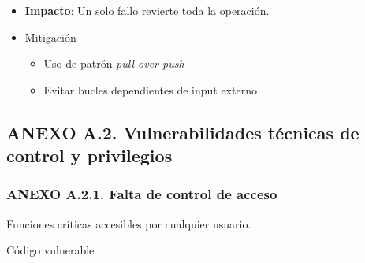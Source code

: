 \begin{itemize}
\tightlist
\item
  \textbf{Impacto}: Un solo fallo revierte toda la operación.
\item
  Mitigación

  \begin{itemize}
  \tightlist
  \item
    Uso de
    \href{https://medium.com/@markojauregui/the-pull-over-push-model-in-solidity-a-secure-pattern-for-fund-withdrawals-10c2e6628626}{patrón
    \emph{pull over push}}
  \item
    Evitar bucles dependientes de input externo
  \end{itemize}
\end{itemize}

\subsection{ANEXO A.2. Vulnerabilidades técnicas de control y
privilegios}\label{anexo-a.2.-vulnerabilidades-tuxe9cnicas-de-control-y-privilegios}

\subsubsection{ANEXO A.2.1. Falta de control de
acceso}\label{anexo-a.2.1.-falta-de-control-de-acceso}

Funciones críticas accesibles por cualquier usuario.

Código vulnerable

\begin{Shaded}
\begin{Highlighting}[]

\OperatorTok{;}

     \NormalTok{() }\NormalTok{ \{}

        \NormalTok{)}\NormalTok{(}\NormalTok{(}\NormalTok{)}\NormalTok{)}\OperatorTok{;}

\NormalTok{    \}}

\NormalTok{\}}
\end{Highlighting}
\end{Shaded}

